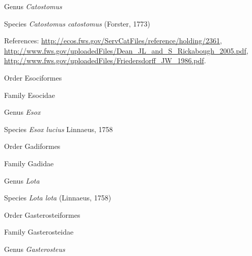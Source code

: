 \documentclass[9pt, article]{memoir}
\begin{document}
\begin{multicols}{2}
\vspace{6pt}\noindent\hspace{30pt}Genus \textit{Catostomus}


\vspace{6pt}\noindent\hspace{36pt}Species \textit{Catostomus catostomus} (Forster, 1773)


\vspace{6pt}References: 
\url{http://ecos.fws.gov/ServCatFiles/reference/holding/2361}, 
\url{http://www.fws.gov/uploadedFiles/Dean_JL_and_S_Rickabough_2005.pdf}, 
\url{http://www.fws.gov/uploadedFiles/Friedersdorff_JW_1986.pdf}.

\vspace{6pt}\noindent\hspace{18pt}Order Esociformes


\vspace{6pt}\noindent\hspace{24pt}Family Esocidae


\vspace{6pt}\noindent\hspace{30pt}Genus \textit{Esox}


\vspace{6pt}\noindent\hspace{36pt}Species \textit{Esox lucius} Linnaeus, 1758


\vspace{6pt}\noindent\hspace{18pt}Order Gadiformes


\vspace{6pt}\noindent\hspace{24pt}Family Gadidae


\vspace{6pt}\noindent\hspace{30pt}Genus \textit{Lota}


\vspace{6pt}\noindent\hspace{36pt}Species \textit{Lota lota} (Linnaeus, 1758)


\vspace{6pt}\noindent\hspace{18pt}Order Gasterosteiformes


\vspace{6pt}\noindent\hspace{24pt}Family Gasterosteidae


\vspace{6pt}\noindent\hspace{30pt}Genus \textit{Gasterosteus}



\end{multicols}
\end{document}
